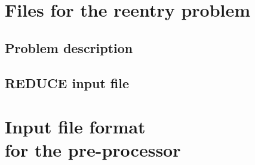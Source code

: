 \documentclass[12pt,a4paper]{article}
\newcommand{\REDUCE}{{\sf\bf REDUCE}}
\newlength{\dummy}
\begin{document}
\newpage

\section[\protect\hspace*{\dummy}Files for the reentry problem]%
        {Files for the reentry problem}

\label{app-SB}

\small

\subsection{Problem description}



\subsection{\REDUCE{} input file}


\newpage

\section[\protect\hspace*{\dummy}Input file format for the pre-processor]%
        {Input file format\\ for the pre-processor}

\label{app:perl-file}
\end{document}
